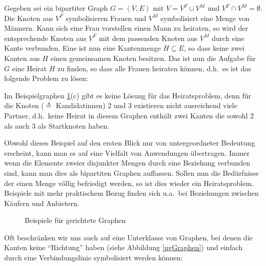 \begin{example}
Gegeben sei ein bipartiter Graph $G = (V,E)$ mit $V = V^F \cup V^M$
und $V^F \cap V^M = \emptyset$. Die Knoten aus $V^F$ symbolisieren
Frauen und $V^M$ symbolisiert eine Menge von Männern. Kann sich eine
Frau vorstellen einen Mann zu heiraten, so wird der entsprechende
Knoten aus $V^F$ mit dem passenden Knoten aus $V^M$ durch eine Kante
verbunden.  Eine  ist nun eine Kantenmenge $H \subseteq
E$, so dass keine zwei Kanten aus $H$ einen gemeinsamen Knoten
besitzen. Das  ist nun die Aufgabe für $G$ eine
Heirat $H$ zu finden, so dass alle Frauen heiraten können, d.h.~es ist
das folgende Problem zu lösen:

\goodbreak
{}

Im Beispielgraphen \ref{gGraphen}(c) gibt es keine Lösung für das
Heiratsproblem, denn für die Knoten ($\triangleq$ Kandidatinnen) $2$ und
$3$ existieren nicht ausreichend viele Partner, d.h.~keine Heirat in
diesem Graphen enthält zwei Kanten die sowohl $2$ als auch $3$ als
Startknoten haben.

\medskip

Obwohl dieses Beispiel auf den ersten Blick nur von untergeordneter
Bedeutung erscheint, kann man es auf eine Vielfalt von Anwendungen
übertragen. Immer wenn die Elemente zweier disjunkter Mengen durch
eine Beziehung verbunden sind, kann man dies als bipartiten Graphen
auffassen. Sollen nun die Bedürfnisse der einen Menge völlig
befriedigt werden, so ist dies wieder ein Heiratsproblem. Beispiele
mit mehr praktischem Bezug finden sich u.a.~bei Beziehungen zwischen
Käufern und Anbietern.
\end{example}

\begin{figure}[h]
\centering
{}
\hspace*{2em}
\hspace*{2em}
\caption{Beispiele für gerichtete Graphen}
\label{gGraphen}
\end{figure}
Oft beschränken wir uns auch auf eine Unterklasse von Graphen, bei
denen die Kanten keine "`Richtung"' haben (siehe
Abbildung \ref{ugGraphen}) und einfach durch eine Verbindungslinie
symbolisiert werden können:

